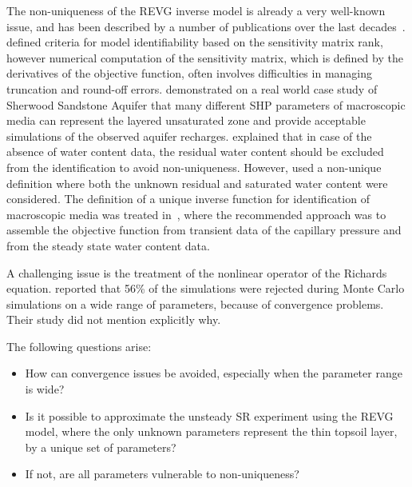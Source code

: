 \documentclass[review,times,3p,10pt]{elsarticle}
\newcommand{\mich}[1]{{\color{magenta}{#1}}}
\begin{document}
The non-uniqueness of the REVG inverse model is already a very well-known issue, and has been described by a number of publications over the last decades~\citep{kool1985, mous1993, ihlwang2003, beven2003-uncertain,Kowalsky04,Nakhaei, Kamali,pena17}.
\cite{mous1993} defined criteria for model identifiability based on the sensitivity matrix rank, however numerical computation of the sensitivity matrix, which is defined by the derivatives of the objective function, often involves difficulties in managing truncation and round-off errors.
\cite{beven2003-uncertain} demonstrated on a real world case study of Sherwood Sandstone Aquifer that many different SHP parameters of macroscopic media can represent the layered unsaturated zone and provide acceptable simulations of the observed aquifer recharges.  \cite{mous1993} explained that in case of the absence of water content data, the residual water content should be excluded from the identification to avoid non-uniqueness. However, \cite{beven2003-uncertain} used
a non-unique definition where both the unknown residual and saturated water content were considered.
The definition of a unique inverse function for identification of macroscopic media was treated in~\citep{zou200126}, where the recommended approach was to assemble the objective function from transient data of the capillary pressure and from the steady state water content data. 

A challenging issue is the treatment of the nonlinear operator of the Richards equation. \cite{beven2003-uncertain} reported that 56\% of the simulations were rejected during Monte Carlo simulations on a wide range of parameters, because of convergence problems. 
Their study did not mention explicitly why. \mich{ We assume that these convergence issues originated from 
 difficult combinations of input parameters, which can be hard to avoid when automatically analyzing a broad parameter space. }


The following questions arise: 
\begin{itemize}
\item How can convergence issues be avoided, especially when the parameter range is wide? 
\item Is it possible to approximate the unsteady SR experiment using the REVG model, where the only unknown parameters represent the thin topsoil layer, by a unique set of parameters? 
\item  If not, are all parameters vulnerable to non-uniqueness?
\end{itemize}
\end{document}

